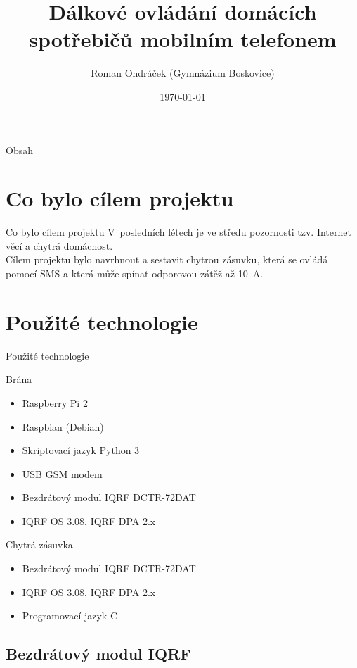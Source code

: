 \documentclass[11pt]{beamer}
\author[Roman Ondráček]{Roman Ondráček (Gymnázium Boskovice)}
\title[Dálkové ovládání domácích spotřebičů]{Dálkové ovládání domácích spotřebičů mobilním telefonem}
\institute[]{Školitel: prof. Ing. Václav Říčný, CSc. (FEKT VUT)}
\date{\today}
\begin{document}
\begin{frame}
\titlepage
\end{frame}

\begin{frame}{Obsah}
\tableofcontents
\end{frame}

\section{Co bylo cílem projektu}

\begin{frame}{Co bylo cílem projektu}
V~posledních létech je ve středu pozornosti tzv. Internet věcí a chytrá domácnost. \\[4mm]
Cílem projektu bylo navrhnout a sestavit chytrou zásuvku, která se ovládá pomocí SMS a která může spínat odporovou zátěž až 10~A.
\end{frame}

\section{Použité technologie}

\begin{frame}{Použité technologie}
  \begin{exampleblock}{Brána}
    \begin{itemize}
      \item Raspberry Pi 2
      \item Raspbian (Debian)
      \item Skriptovací jazyk Python 3
      \item USB GSM modem
      \item Bezdrátový modul IQRF DCTR-72DAT
      \item IQRF OS 3.08, IQRF DPA 2.x
    \end{itemize}
  \end{exampleblock}
  \begin{alertblock}{Chytrá zásuvka}
    \begin{itemize}
      \item Bezdrátový modul IQRF DCTR-72DAT
      \item IQRF OS 3.08, IQRF DPA 2.x
      \item Programovací jazyk C
    \end{itemize}
  \end{alertblock}
\end{frame}

\subsection{Bezdrátový modul IQRF}
\end{document}
